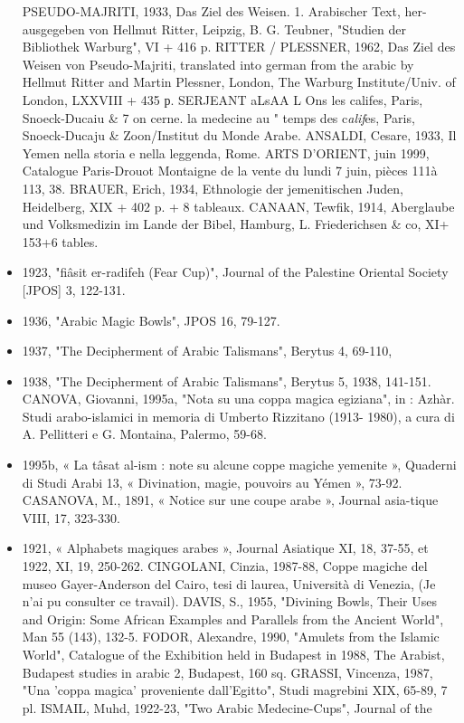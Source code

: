 \begin{itemize}
PSEUDO-MAJRITI, 1933, Das Ziel des Weisen. 1. Arabischer Text, her-
ausgegeben von Hellmut Ritter, Leipzig, B. G. Teubner, "Studien der
Bibliothek Warburg", VI + 416 p.
RITTER / PLESSNER, 1962, Das Ziel des Weisen von Pseudo-Majriti,
translated into german from the arabic by Hellmut Ritter and Martin
Plessner, London, The Warburg Institute/Univ. of London, LXXVIII
+ 435 р.
SERJEANT aLsAA L Ons les c{alif}es, Paris, Snoeck-Ducaiu \& 7 on cerne. la medecine au
" temps des c\textit{alif}es, Paris, Snoeck-Ducaju \& Zoon/Institut du Monde Arabe.
ANSALDI, Cesare, 1933, Il Yemen nella storia e nella leggenda, Rome.
ARTS D'ORIENT, juin 1999, Catalogue Paris-Drouot Montaigne de la vente du lundi 7 juin, pièces 111à 113, 38.
BRAUER, Erich, 1934, Ethnologie der jemenitischen Juden, Heidelberg,
XIX + 402 p. + 8 tableaux.
CANAAN, Tewfik, 1914, Aberglaube und Volksmedizin im Lande der
Bibel, Hamburg, L. Friederichsen \& co, XI+ 153+6 tables.
\item 1923, "fiâsit er-radifeh (Fear Cup)", Journal of the Palestine Oriental Society [JPOS] 3, 122-131.
\item 1936, "Arabic Magic Bowls", JPOS 16, 79-127.
\item 1937, "The Decipherment of Arabic Talismans", Berytus 4, 69-110,
\item 1938, "The Decipherment of Arabic Talismans", Berytus 5, 1938,
141-151.
CANOVA, Giovanni, 1995a, "Nota su una coppa magica egiziana", in :
Azhàr. Studi arabo-islamici in memoria di Umberto Rizzitano (1913-
1980), a cura di A. Pellitteri e G. Montaina, Palermo, 59-68.
\item 1995b, « La tâsat al-ism : note su alcune coppe magiche yemenite », Quaderni di Studi Arabi 13, « Divination, magie, pouvoirs au
Yémen », 73-92.
CASANOVA, M., 1891, « Notice sur une coupe arabe », Journal asia-tique VIII, 17, 323-330.
\item 1921, « Alphabets magiques arabes », Journal Asiatique XI, 18,
37-55, et 1922, XI, 19, 250-262.
CINGOLANI, Cinzia, 1987-88, Coppe magiche del museo Gayer-Anderson del Cairo, tesi di laurea, Università di Venezia, (Je n'ai pu consulter ce travail).
DAVIS, S., 1955, "Divining Bowls, Their Uses and Origin: Some African Examples and Parallels from the Ancient World", Man 55
(143), 132-5.
FODOR, Alexandre, 1990, "Amulets from the Islamic World", Catalogue of the Exhibition held in Budapest in 1988, The Arabist, Budapest studies in arabic 2, Budapest, 160 sq.
GRASSI, Vincenza, 1987, "Una 'coppa magica' proveniente dall'Egitto",
Studi magrebini XIX, 65-89, 7 pl.
ISMAIL, Muhd, 1922-23, "Two Arabic Medecine-Cups", Journal of the

\end{itemize}

